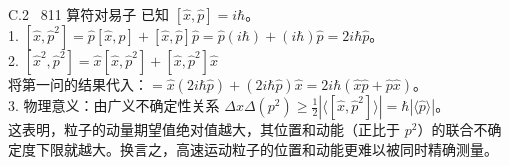 \documentclass[a4paper,11pt]{article}
\begin{document}
\begin{solution}{C.2 \textbar\ 811 算符对易子}
已知 $[\hat{x}, \hat{p}] = i\hbar$。\\
1. $[\hat{x}, \hat{p}^2] = \hat{p}[\hat{x}, \hat{p}] + [\hat{x}, \hat{p}]\hat{p} = \hat{p}(i\hbar) + (i\hbar)\hat{p} = 2i\hbar\hat{p}$。\\
2. $[\hat{x}^2, \hat{p}^2] = \hat{x}[\hat{x}, \hat{p}^2] + [\hat{x}, \hat{p}^2]\hat{x}$\\
将第一问的结果代入：$= \hat{x}(2i\hbar\hat{p}) + (2i\hbar\hat{p})\hat{x} = 2i\hbar(\hat{x}\hat{p} + \hat{p}\hat{x})$。\\
3. 物理意义：由广义不确定性关系 $\Delta x \Delta (p^2) \ge \frac{1}{2} | \langle [\hat{x}, \hat{p}^2] \rangle | = \hbar |\langle \hat{p} \rangle|$。\\
这表明，粒子的动量期望值绝对值越大，其位置和动能（正比于 $p^2$）的联合不确定度下限就越大。换言之，高速运动粒子的位置和动能更难以被同时精确测量。
\end{solution}
\end{document}
